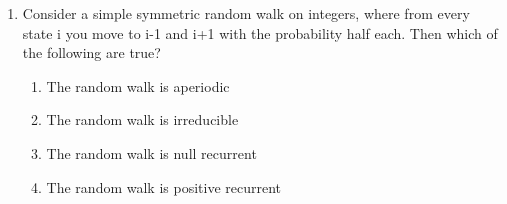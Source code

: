 \begin{enumerate}[label=\thesection.\arabic*.,ref=\thesection.\theenumi]
\solution 
  
  \item Consider a simple symmetric random walk on integers, where from every state i you move to i-1 and i+1 with the probability half each. Then which of the following are true?
  \begin{enumerate}
  \item The random walk is aperiodic
  \item The random walk is irreducible
  \item The random walk is null recurrent 
  \item The random walk is positive recurrent
  \end{enumerate}
%
\solution 
  



\end{enumerate}